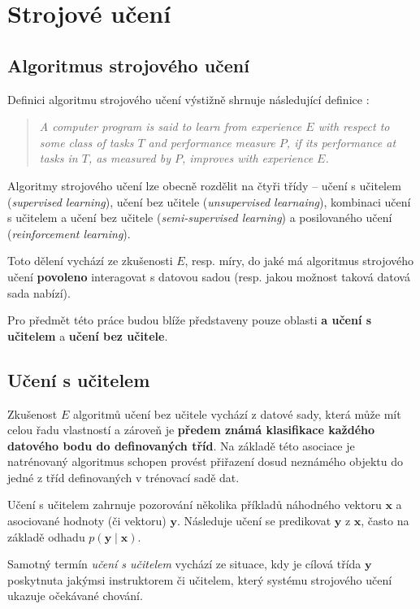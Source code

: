 \section{Strojové učení}
\subsection{Algoritmus strojového učení}
\label{sec:machine_learning_algorithm}
Definici algoritmu strojového učení výstižně shrnuje následující definice \cite[str. 2]{Mitchell1997}:
\blockquote{\emph{A computer program is said to learn from experience $E$ with respect to some class of tasks $T$ and performance measure $P$, if its performance at tasks in $T$, as measured by $P$, improves with experience $E$.}}

Algoritmy strojového učení lze obecně rozdělit na čtyři třídy – učení s učitelem (\emph{supervised learning}),
učení bez učitele (\emph{unsupervised learnaing}), kombinaci učení s učitelem a učení bez učitele (\emph{semi-supervised learning}) a posilovaného učení (\emph{reinforcement learning}).

Toto dělení vychází ze zkušenosti $E$, resp. míry, do jaké má algoritmus strojového učení \textbf{povoleno} interagovat s datovou sadou (resp. jakou možnost taková datová sada nabízí). \cite{Goodfellow2016}

Pro předmět této práce budou blíže představeny pouze oblasti \textbf{a učení s učitelem} a \textbf{učení bez učitele}.
\subsection{Učení s učitelem}
\label{sec:supervised_learning}
Zkušenost $E$ algoritmů učení bez učitele vychází z datové sady, která může mít celou řadu vlastností a zároveň je \textbf{předem známá klasifikace každého datového bodu do definovaných tříd}.
Na základě této asociace je natrénovaný algoritmus schopen provést přiřazení dosud neznámého objektu do jedné z tříd definovaných v trénovací sadě dat.

Učení s učitelem zahrnuje pozorování několika příkladů náhodného vektoru $\mathbf{x}$ a asociované hodnoty (či vektoru) $\mathbf{y}$.
Následuje učení se predikovat $\mathbf{y}$ z $\mathbf{x}$, často na základě odhadu $p(\mathbf{y}\mid\mathbf{x})$.

Samotný termín \emph{učení s učitelem} vychází ze situace, kdy je cílová třída $\mathbf{y}$ poskytnuta jakýmsi instruktorem či učitelem, který systému strojového učení ukazuje očekávané chování. \cite{Goodfellow2016}
